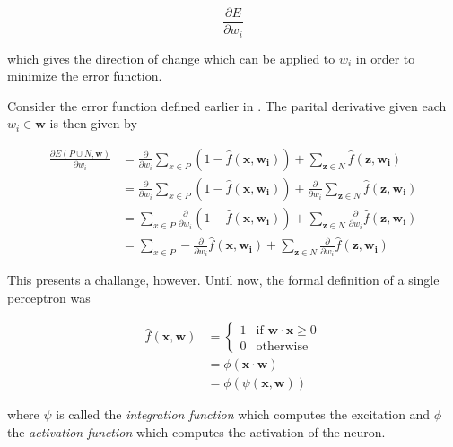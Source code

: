 \begin{equation}
    \frac{\partial E}{\partial w_i}
\end{equation}

which gives the direction of change which can be applied to $w_i$ in order to minimize the error function.

Consider the error function defined earlier in .
The parital derivative given each $w_i \in \bm{w}$ is then given by

\begin{equation}
    \label{eq:error-derivative-1}
    \begin{split}
        \frac{\partial E(P \cup N, \bm{w})}{\partial w_i}
        &= \frac{\partial }{\partial w_i} \sum_{x \in P} (1 - \hat{f}(\bm{x},\bm{w_i})) + \sum_{\bm{z} \in N} \hat{f}(\bm{z},\bm{w_i}) \\
        &= \frac{\partial }{\partial w_i} \sum_{x \in P} (1 - \hat{f}(\bm{x},\bm{w_i})) + \frac{\partial }{\partial w_i} \sum_{\bm{z} \in N} \hat{f}(\bm{z},\bm{w_i}) \\
        &= \sum_{x \in P} \frac{\partial }{\partial w_i} (1 - \hat{f}(\bm{x},\bm{w_i})) + \sum_{\bm{z} \in N} \frac{\partial }{\partial w_i} \hat{f}(\bm{z},\bm{w_i}) \\
        &= \sum_{x \in P} - \frac{\partial }{\partial w_i} \hat{f}(\bm{x},\bm{w_i}) + \sum_{\bm{z} \in N} \frac{\partial }{\partial w_i} \hat{f}(\bm{z},\bm{w_i}) 
    \end{split}
\end{equation}

This presents a challange, however.
Until now, the formal definition of a single perceptron was 

\begin{equation}
    \begin{split}
        \hat{f}(\bm{x}, \bm{w}) 
        &=         
            \begin{cases}
                1 & \text{if } \bm{w} \cdot \bm{x} \geq 0 \\
                0 & \text{otherwise}
            \end{cases} 
        \\
        &= \phi(\bm{x} \cdot \bm{w})
        \\
        &= \phi(\psi(\bm{x}, \bm{w}))
    \end{split}
\end{equation}

where $\psi$ is called the \textit{integration function} which computes the excitation and $\phi$ the \textit{activation function} which computes the activation of the neuron.

